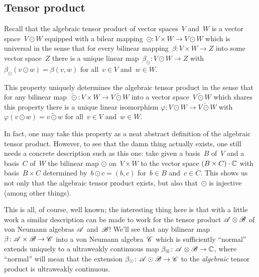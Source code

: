 \documentclass[a]{subfiles}
\begin{document}
\subsection{Tensor product}
\begin{parsec}%
\begin{point}%
Recall that the algebraic tensor product
of vector spaces~$V$ and~$W$
is a vector space~$V\odot W$
equipped
with a bilear mapping~$\odot\colon V\times W\to V\odot W$
which is  universal  
in the sense that for every bilinear mapping~$\beta\colon V\times W\to Z$
into some vector space~$Z$
there is a unique linear map~$\beta_\odot\colon V\odot W\to Z$
with~$\beta_\odot(v\odot w)=\beta(v,w)$
for all~$v\in V$ and~$w\in W$.

This property uniquely determines the algebraic tensor product in the sense
that for any bilinear map~$\mathbin{\tilde\odot}\colon
 V\times W\to V\mathbin{\tilde\odot} W$
 into a vector space~$V\mathbin{\tilde \odot} W$
which shares this property
there is a unique linear isomorphism $\varphi\colon V\odot W\to V
\mathbin{\tilde \odot} W$
with $\varphi(v\odot w) = v\mathbin{\tilde\odot} w$
for all~$v\in V$ and~$w\in W$.

In fact, one may take this property as a neat abstract 
definition of the algebraic
tensor product.
However, to  see that the damn thing actually exists,
one still needs a concrete description
such as this one:
take given a basis~$B$ of~$V$ and a basis~$C$ of~$W$
the bilinear map $\odot$ on~$V\times W$
to the vector space $(B\times C)\cdot \mathbb{C}$ with basis~$B\times C$
determined by~$b\odot c = (b,c)$
for~$b\in B$ and~$c\in C$.
This shows us not only that the algebraic tensor product
exists,
but also 
that~$\odot$ is injective (among other things).

This is all, of course, well known; the interesting thing here is that
with a little work
a similar description 
can be made to work
for the tensor product $\mathscr{A}\otimes \mathscr{B}$ of von Neumann algebras
$\mathscr{A}$ and~$\mathscr{B}$!
We'll see that any bilinear map $\beta\colon \mathscr{A}\times \mathscr{B}\to\mathscr{C}$
into a von Neumann algebra~$\mathscr{C}$
which is sufficiently ``normal''
extends uniquely to a ultraweakly continuous
map $\beta_\otimes \colon  \mathscr{A}\otimes \mathscr{B}\to\mathbb{C}$,
where ``normal'' will mean 
that the extension $\beta_\odot\colon \mathscr{A}\odot\mathscr{B}\to\mathscr{C}$
to the \emph{algebraic} tensor product
is ultraweakly continuous.


\end{point}
\end{parsec}
\end{document}
